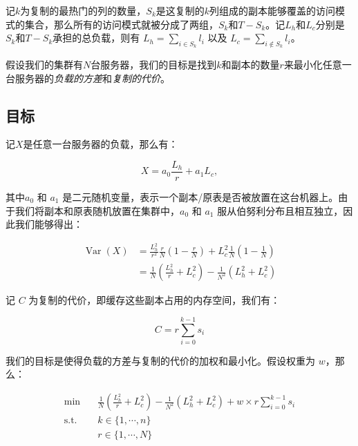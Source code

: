 \par 记$k$为复制的最热门的列的数量，$S_k$是这复制的$k$列组成的副本能够覆盖的访问模式的集合，那么所有的访问模式就被分成了两组，$S_k$和$T-S_k$。记$L_h$和$L_c$分别是$S_k$和$T-S_k$承担的总负载，则有 $L_h=\sum_{i \in S_{k}} l_{i}$ 以及 $ L_c = \sum_{i \notin S_{k}} l_{i}$。

\par 假设我们的集群有$N$台服务器，我们的目标是找到$k$和副本的数量$r$来最小化任意一台服务器的\emph{负载的方差}和\emph{复制的代价}。

\subsection{目标}
\par 记$X$是任意一台服务器的负载，那么有：

\begin{equation}
    X=a_{0} \frac{L_{h}}{r}+a_{1} L_c,
\end{equation}

\par 其中$a_0$ 和 $ a_1$ 是二元随机变量，表示一个副本/原表是否被放置在这台机器上。由于我们将副本和原表随机放置在集群中，$a_0$ 和 $ a_1$ 服从伯努利分布且相互独立，因此我们能够得出：

\begin{equation}
\begin{split}
\operatorname{Var}(X)&=\frac{L_{h}^{2}}{r^{2}}\frac{r}{N}\left(1-\frac{r}{N}\right)+L_{c}^{2}\frac{1}{N}\left(1-\frac{1}{N}\right) \\
& = \frac{1}{N}\left(\frac{L_{h}^{2}}{r}+L_{c}^{2}\right) - \frac{1}{N^2}\left( L_h^2 + L_c^2\right)
\end{split}
\end{equation}

\par 记 $C$ 为复制的代价，即缓存这些副本占用的内存空间，我们有：

\begin{equation}
    C = r \sum_{i=0}^{k-1} s_i
\end{equation}

\par 我们的目标是使得负载的方差与复制的代价的加权和最小化。假设权重为 $w$，那么：

\begin{equation}
\label{eq:obj}
\begin{aligned}
\min \quad & \frac{1}{N}\left(\frac{L_{h}^{2}}{r}+L_{c}^{2}\right) - \frac{1}{N^2}\left( L_h^2 + L_c^2\right) + w\times r \sum_{i=0}^{k-1} s_i\\
\textrm{s.t.} \quad & k \in \{1, \cdots, n\}\\
& r \in \{1, \cdots, N\}    \\
\end{aligned}
\end{equation}

